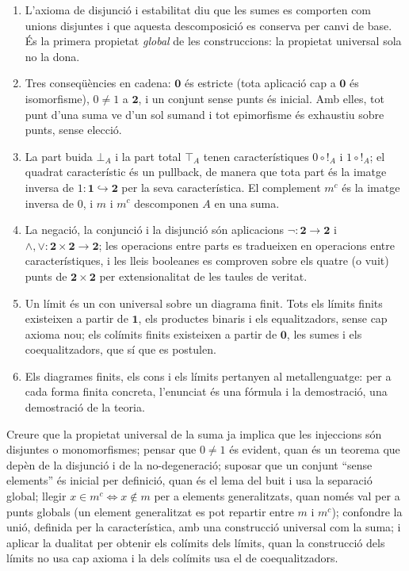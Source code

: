 \begin{resumcap}
\begin{enumerate}
  \item L'axioma de disjunció i estabilitat diu que les sumes es comporten com unions disjuntes i que aquesta descomposició es conserva per canvi de base. És la primera propietat \emph{global} de les construccions: la propietat universal sola no la dona.
  \item Tres conseqüències en cadena: \(\mathbf0\) és estricte (tota aplicació cap a \(\mathbf0\) és isomorfisme), \(0\ne1\) a \(\mathbf2\), i un conjunt sense punts és inicial. Amb elles, tot punt d'una suma ve d'un sol sumand i tot epimorfisme és exhaustiu sobre punts, sense elecció.
  \item La part buida \(\bot_A\) i la part total \(\top_A\) tenen característiques \(0\circ{!}_A\) i \(1\circ{!}_A\); el quadrat característic és un pullback, de manera que tota part és la imatge inversa de \(1\colon\mathbf1\hookrightarrow\mathbf2\) per la seva característica. El complement \(m^c\) és la imatge inversa de \(0\), i \(m\) i \(m^c\) descomponen \(A\) en una suma.
  \item La negació, la conjunció i la disjunció són aplicacions \(\neg\colon\mathbf2\to\mathbf2\) i \(\wedge,\vee\colon\mathbf2\times\mathbf2\to\mathbf2\); les operacions entre parts es tradueixen en operacions entre característiques, i les lleis booleanes es comproven sobre els quatre (o vuit) punts de \(\mathbf2\times\mathbf2\) per extensionalitat de les taules de veritat.
  \item Un límit és un con universal sobre un diagrama finit. Tots els límits finits existeixen a partir de \(\mathbf1\), els productes binaris i els equalitzadors, sense cap axioma nou; els colímits finits existeixen a partir de \(\mathbf0\), les sumes i els coequalitzadors, que sí que es postulen.
  \item Els diagrames finits, els cons i els límits pertanyen al metallenguatge: per a cada forma finita concreta, l'enunciat és una fórmula i la demostració, una demostració de la teoria.
\end{enumerate}
 Creure que la propietat universal de la suma ja implica que les injeccions són disjuntes o monomorfismes; pensar que \(0\ne1\) és evident, quan és un teorema que depèn de la disjunció i de la no-degeneració; suposar que un conjunt \enquote{sense elements} és inicial per definició, quan és el lema del buit i usa la separació global; llegir \(x\in m^c\iff x\notin m\) per a elements generalitzats, quan només val per a punts globals (un element generalitzat es pot repartir entre \(m\) i \(m^c\)); confondre la unió, definida per la característica, amb una construcció universal com la suma; i aplicar la dualitat per obtenir els colímits dels límits, quan la construcció dels límits no usa cap axioma i la dels colímits usa el de coequalitzadors.

\end{resumcap}
